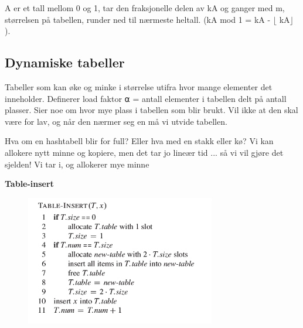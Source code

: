 \documentclass[12pt]{report}
\begin{document}
A er et tall mellom 0 og 1, tar den fraksjonelle delen av kA og ganger med m, størrelsen på tabellen, runder ned til nærmeste heltall. (kA mod 1 = kA - $ \lfloor $ kA$ \rfloor $ ).\par


\vspace{\baselineskip}
\subsection*{Dynamiske tabeller}
Tabeller som kan øke og minke i størrelse utifra hvor mange elementer det inneholder. Definerer load faktor ⍺ = antall elementer i tabellen delt på antall plasser. Sier noe om hvor mye plass i tabellen som blir brukt. Vil ikke at den skal være for lav, og når den nærmer seg en må vi utvide tabellen.\par


\vspace{\baselineskip}
Hva om en hashtabell blir for full? Eller hva med en stakk eller kø? Vi kan allokere nytt minne og kopiere, men det tar jo lineær tid ... så vi vil gjøre det sjelden!  Vi tar i, og allokerer mye minne\par


\vspace{\baselineskip}
\textbf{Table-insert}\par




\begin{figure}[H]
	\begin{Center}
		\includegraphics[width=3.26in,height=2.23in]{./media/image21.png}
	\end{Center}
\end{figure}


\end{document}
